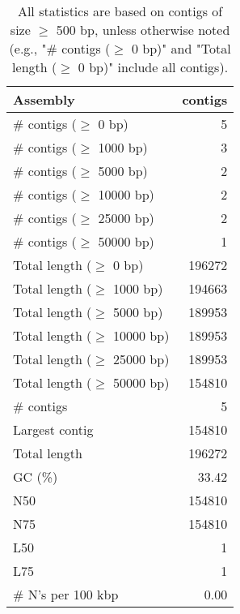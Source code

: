 \documentclass[12pt,a4paper]{article}
\begin{document}
\begin{table}[ht]
\begin{center}
\caption{All statistics are based on contigs of size $\geq$ 500 bp, unless otherwise noted (e.g., "\# contigs ($\geq$ 0 bp)" and "Total length ($\geq$ 0 bp)" include all contigs).}
\begin{tabular}{|l*{1}{|r}|}
\hline
Assembly & contigs \\ \hline
\# contigs ($\geq$ 0 bp) & 5 \\ \hline
\# contigs ($\geq$ 1000 bp) & 3 \\ \hline
\# contigs ($\geq$ 5000 bp) & 2 \\ \hline
\# contigs ($\geq$ 10000 bp) & 2 \\ \hline
\# contigs ($\geq$ 25000 bp) & 2 \\ \hline
\# contigs ($\geq$ 50000 bp) & 1 \\ \hline
Total length ($\geq$ 0 bp) & 196272 \\ \hline
Total length ($\geq$ 1000 bp) & 194663 \\ \hline
Total length ($\geq$ 5000 bp) & 189953 \\ \hline
Total length ($\geq$ 10000 bp) & 189953 \\ \hline
Total length ($\geq$ 25000 bp) & 189953 \\ \hline
Total length ($\geq$ 50000 bp) & 154810 \\ \hline
\# contigs & 5 \\ \hline
Largest contig & 154810 \\ \hline
Total length & 196272 \\ \hline
GC (\%) & 33.42 \\ \hline
N50 & 154810 \\ \hline
N75 & 154810 \\ \hline
L50 & 1 \\ \hline
L75 & 1 \\ \hline
\# N's per 100 kbp & 0.00 \\ \hline
\end{tabular}
\end{center}
\end{table}
\end{document}
